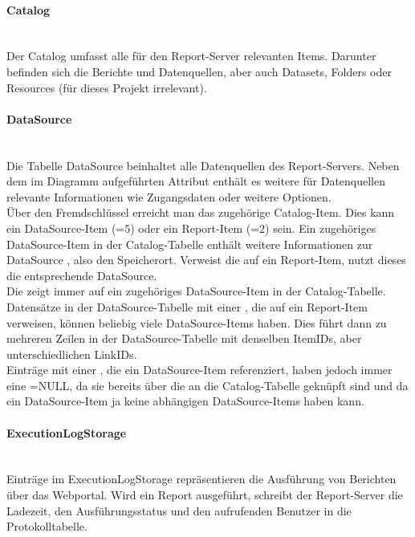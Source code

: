 \paragraph{Catalog} ~\\
\label{p:Catalog}
Der Catalog umfasst alle für den Report-Server relevanten Items. Darunter befinden sich die Berichte und Datenquellen, aber auch \zB Datasets, Folders oder Resources (für dieses Projekt irrelevant).

\paragraph{DataSource} ~\\
\label{p:DataSource}
Die Tabelle DataSource beinhaltet alle Datenquellen des Report-Servers. Neben dem im Diagramm aufgeführten Attribut  enthält es weitere für Datenquellen relevante Informationen wie Zugangsdaten oder weitere Optionen.\\
Über den Fremdschlüssel  erreicht man das zugehörige Catalog-Item. Dies kann ein Data\-Source-Item (=5) oder ein Report-Item (=2) sein. Ein zugehöriges Data\-Source-Item in der Catalog-Tabelle enthält weitere Informationen zur DataSource \zB {}, also den Speicherort. Verweist die  auf ein Report-Item, nutzt dieses die entsprechende DataSource.\\
Die  zeigt immer auf ein zugehöriges DataSource-Item in der Catalog-Tabelle. Datensätze in der DataSource-Tabelle mit einer , die auf ein Report-Item verweisen, können beliebig viele DataSource-Items haben. Dies führt dann zu mehreren Zeilen in der DataSource-Tabelle mit denselben ItemIDs, aber unterschiedlichen LinkIDs.\\
Einträge mit einer , die ein DataSource-Item referenziert, haben jedoch immer eine =NULL, da sie bereits über die  an die Catalog-Tabelle geknüpft sind und da ein DataSource-Item ja keine abhängigen DataSource-Items haben kann.

\paragraph{ExecutionLogStorage} ~\\
\label{p:ExecutionLogStorage}
Einträge im ExecutionLogStorage repräsentieren die Ausführung von Berichten über das Webportal. Wird ein Report ausgeführt, schreibt der Report-Server \ua die Ladezeit, den Ausführungsstatus und den aufrufenden Benutzer in die Protokolltabelle.


